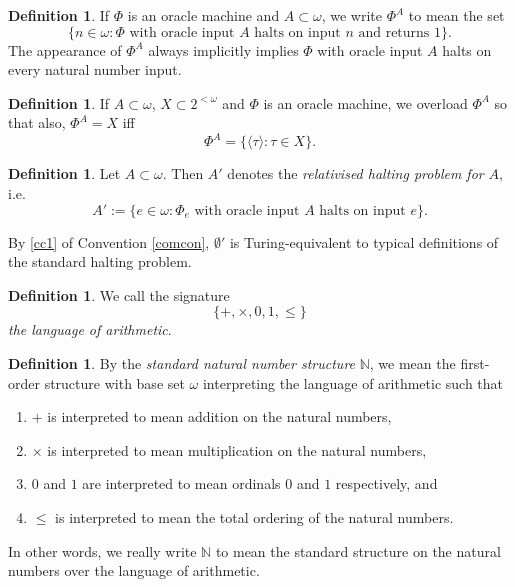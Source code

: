 \documentclass[12pt, twoside]{memoir}
\numberwithin{equation}{section}
\theoremstyle{definition}
\newtheorem{defi}[thm]{Definition}
\theoremstyle{remark}
\theoremstyle{definition}
\theoremstyle{definition}
\theoremstyle{definition}
\theoremstyle{remark}
\begin{document}
\begin{defi}
If $\Phi$ is an oracle machine and $A \subset \omega$, we write $\Phi^A$ to mean the set
\begin{equation*}
    \{n \in \omega : \Phi \text{ with oracle input } A \text{ halts on input } n \text{ and returns } 1\} \text{.}
\end{equation*}
The appearance of $\Phi^A$ always implicitly implies $\Phi$ with oracle input $A$ halts on every natural number input.
\end{defi}

\begin{defi}
If $A \subset \omega$, $X \subset 2^{< \omega}$ and $\Phi$ is an oracle machine, we overload $\Phi^A$ so that also, $\Phi^A = X$ iff
\begin{equation*}
    \Phi^A = \{\langle \tau \rangle : \tau \in X\} \text{.}
\end{equation*}
\end{defi}

\begin{defi}
Let $A \subset \omega$. Then $A'$ denotes the \emph{relativised halting problem for} $A$, i.e. $$A' := \{e \in \omega : \Phi_e \text{ with oracle input } A \text{ halts on input } e\} \text{.}$$ 
\end{defi}

By \ref{cc1} of Convention \ref{comcon}, $\emptyset'$ is Turing-equivalent to typical definitions of the standard halting problem.

\begin{defi}
We call the signature $$\{+, \times, 0, 1, \leq\}$$ \emph{the language of arithmetic}. 
\end{defi}

\begin{defi}
By the \emph{standard natural number structure} $\mathbb{N}$, we mean the first-order structure with base set $\omega$ interpreting the language of arithmetic such that
\begin{enumerate}[label=(\alph*)]
    \item $+$ is interpreted to mean addition on the natural numbers,
    \item $\times$ is interpreted to mean multiplication on the natural numbers,
    \item $0$ and $1$ are interpreted to mean ordinals $0$ and $1$ respectively, and
    \item $\leq$ is interpreted to mean the total ordering of the natural numbers.
\end{enumerate} 
In other words, we really write $\mathbb{N}$ to mean the standard structure on the natural numbers over the language of arithmetic.
\end{defi}
\end{document}
